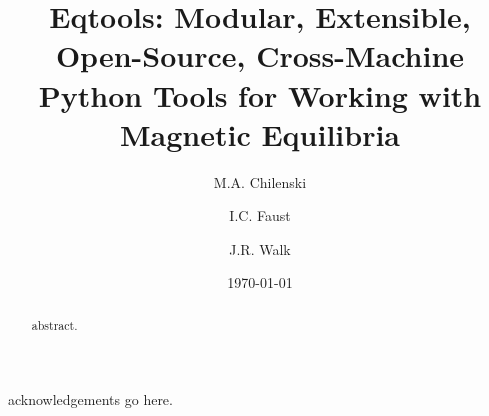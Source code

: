 \documentclass[12pt,floatfix,showpacs]{revtex4-1}
\begin{document}
\title{Eqtools: Modular, Extensible, Open-Source, Cross-Machine Python Tools for Working with Magnetic Equilibria}

\author{M.A. Chilenski}

\author{I.C. Faust}

\author{J.R. Walk}

\date{\today}

\begin{abstract}
 abstract.
\end{abstract}

\pacs{}

\maketitle





\begin{acknowledgements}
 acknowledgements go here.
\end{acknowledgements}

\end{document}
